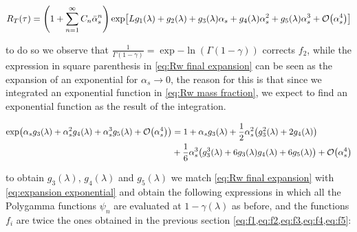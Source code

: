 \documentclass[../main.tex]{subfiles}
\begin{document}
\begin{equation}
    R_T(\tau) = \qty(1 + \sum_{n=1}^{\infty} C_n \bar{\alpha}_s^n)\exp[L g_1(\lambda)  + g_2(\lambda) + g_3(\lambda) \alpha_s + g_4(\lambda) \alpha_s^2 + g_5(\lambda) \alpha_s^3 + \order{\alpha_s^4}]
\end{equation}

to do so we observe that $\frac{1}{\Gamma(1-\gamma)}= \exp{-\ln(\Gamma(1-\gamma))}$ corrects $f_2$, while the expression in square parenthesis in \cref{eq:Rw final expansion} can be seen 
as the expansion of an exponential for $\alpha_s \to 0$, the reason for this is that since we integrated an exponential function in \cref{eq:Rw mass fraction}, we 
expect to find an exponential function as the result of the integration.

\begin{equation}
    \begin{split}\label{eq:expansion exponential}
    \exp(\alpha_s g_3(\lambda) + \alpha_s^2 g_4(\lambda) + \alpha_s^3 g_5(\lambda) + \order{\alpha_s^4}) &= 1+\alpha_s g_3(\lambda)+\frac{1}{2} \alpha_s^2 \qty(g_3^2(\lambda)+2 g_4(\lambda))\\
    &+\frac{1}{6} \alpha_s^3 \qty(g_3^3(\lambda) + 6 g_3(\lambda) g_4(\lambda) + 6 g_5(\lambda))+ \order{\alpha_s^4}
    \end{split}
\end{equation}

to obtain $g_3(\lambda)$, $g_4(\lambda)$ and $g_5(\lambda)$ we match \cref{eq:Rw final expansion} with \cref{eq:expansion exponential} and obtain the following expressions in which all 
the Polygamma functions $\psi_n$ are evaluated at $1-\gamma(\lambda)$ as before, and the functions $f_i$ are twice the ones obtained in the previous section \cref{eq:f1,eq:f2,eq:f3,eq:f4,eq:f5}: 
\end{document}
